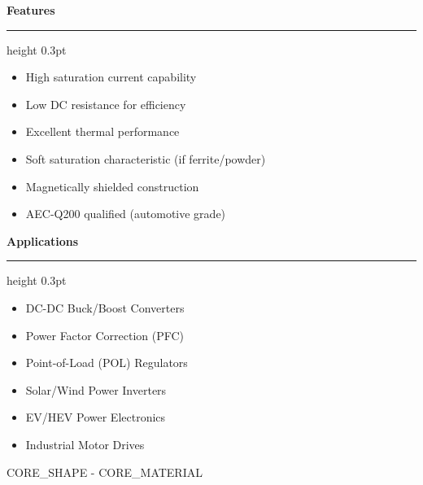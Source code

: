\documentclass[10pt,a4paper]{article}
\newcommand{\sectiontitle}[1]{%
    \vspace{3mm}%
    {\large\bfseries\color{primary}#1}%
    \vspace{1mm}%
    \hrule height 0.3pt%
    \vspace{2mm}%
}
\begin{document}
\vspace{3mm}

\begin{minipage}[t]{0.48\textwidth}
    \sectiontitle{Features}
    \begin{itemize}[leftmargin=4mm, itemsep=1pt, topsep=0pt]
        \item High saturation current capability
        \item Low DC resistance for efficiency
        \item Excellent thermal performance
        \item Soft saturation characteristic (if ferrite/powder)
        \item Magnetically shielded construction
        \item AEC-Q200 qualified (automotive grade)
    \end{itemize}
    
    \vspace{2mm}
    \sectiontitle{Applications}
    \begin{itemize}[leftmargin=4mm, itemsep=1pt, topsep=0pt]
        \item DC-DC Buck/Boost Converters
        \item Power Factor Correction (PFC)
        \item Point-of-Load (POL) Regulators
        \item Solar/Wind Power Inverters
        \item EV/HEV Power Electronics
        \item Industrial Motor Drives
    \end{itemize}
\end{minipage}
\hfill
\begin{minipage}[t]{0.48\textwidth}
    \centering
    
    \vspace{2mm}
    {\footnotesize\color{textmuted} {{CORE_SHAPE}} - {{CORE_MATERIAL}}}
\end{minipage}
\end{document}
